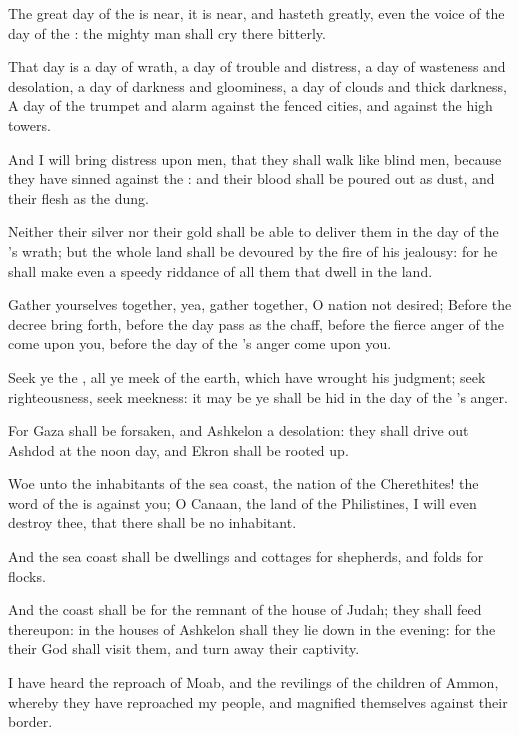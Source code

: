\Verse The great day of the \LORD is near, it is near, and hasteth greatly, even the voice of the day of the \LORD: the mighty man shall cry there bitterly.

\Verse That day is a day of wrath, a day of trouble and distress, a day of wasteness and desolation, a day of darkness and gloominess, a day of clouds and thick darkness, \Verse A day of the trumpet and alarm against the fenced cities, and against the high towers.

\Verse And I will bring distress upon men, that they shall walk like blind men, because they have sinned against the \LORD: and their blood shall be poured out as dust, and their flesh as the dung.

\Verse Neither their silver nor their gold shall be able to deliver them in the day of the \LORD's wrath; but the whole land shall be devoured by the fire of his jealousy: for he shall make even a speedy riddance of all them that dwell in the land.


\Chapter
\Verse Gather yourselves together, yea, gather together, O nation not desired; \Verse Before the decree bring forth, before the day pass as the chaff, before the fierce anger of the \LORD come upon you, before the day of the \LORD's anger come upon you.

\Verse Seek ye the \LORD, all ye meek of the earth, which have wrought his judgment; seek righteousness, seek meekness: it may be ye shall be hid in the day of the \LORD's anger.

\Verse For Gaza shall be forsaken, and Ashkelon a desolation: they shall drive out Ashdod at the noon day, and Ekron shall be rooted up.

\Verse Woe unto the inhabitants of the sea coast, the nation of the Cherethites! the word of the \LORD is against you; O Canaan, the land of the Philistines, I will even destroy thee, that there shall be no inhabitant.

\Verse And the sea coast shall be dwellings and cottages for shepherds, and folds for flocks.

\Verse And the coast shall be for the remnant of the house of Judah; they shall feed thereupon: in the houses of Ashkelon shall they lie down in the evening: for the \LORD their God shall visit them, and turn away their captivity.

\Verse I have heard the reproach of Moab, and the revilings of the children of Ammon, whereby they have reproached my people, and magnified themselves against their border.


